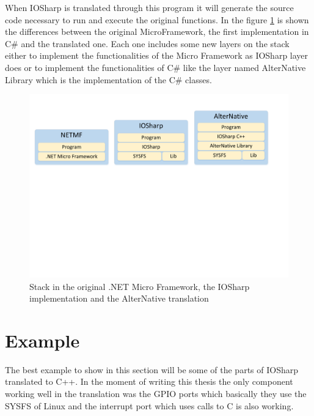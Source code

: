 When IOSharp is translated through this program it will generate the source code necessary to run and execute the original functions. In the figure \ref{fig:AN-Example-IOSharp} is shown the differences between the original MicroFramework, the first implementation in C\# and the translated one. Each one includes some new layers on the stack either to implement the functionalities of the Micro Framework as IOSharp layer does or to implement the functionalities of C\# like the layer named AlterNative Library which is the implementation of the C\# classes.

\begin{figure}[H]\begin{center}
 \centering
  \captionsetup{justification=centering}
  \includegraphics[width=1\textwidth]{pictures/alternative/transformations-iosharp}
  \caption{Stack in the original .NET Micro Framework, the IOSharp implementation and the AlterNative translation\label{fig:AN-Example-IOSharp}}
\end{center}\end{figure}

\section{Example}\label{SS:AN-Process-Example}
The best example to show in this section will be some of the parts of IOSharp translated to C++. In the moment of writing this thesis the only component working well in the translation was the GPIO ports which basically they use the \gls{SYSFS} of Linux and the interrupt port which uses calls to C is also working.


